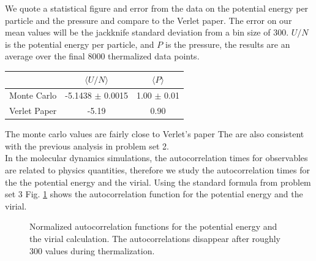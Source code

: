 \documentclass[singlepage,notitlepage,nofootinbib,11pt]{revtex4-1}
\begin{document}
We quote a statistical figure and error from the data on the potential energy per particle and the pressure and compare to the Verlet paper. The error on our mean values will be the jackknife standard deviation from a bin size of 300. $U/N$ is the potential energy per particle, and $P$ is the pressure, the results are an average over the final 8000 thermalized data points.
  \begin{center}
    \begin{tabular}{| c | c | c |}\hline
      \hspace{1pt} & $\langle U/N \rangle$ & $\langle P \rangle$ \\ \hline
      Monte Carlo  & -5.1438 $\pm$ 0.0015 &  1.00 $\pm$ 0.01 \\ \hline
      Verlet Paper & -5.19 & 0.90 \\ \hline
    \end{tabular}
  \end{center}
The monte carlo values are fairly close to Verlet's paper The are also consistent with the previous analysis in problem set 2.\\
\indent In the molecular dynamics simulations, the autocorrelation times for observables are related to physics quantities, therefore we study the autocorrelation times for the the potential energy and the virial. Using the standard formula from problem set 3 Fig. \ref{corrs} shows the autocorrelation function for the potential energy and the virial.
\begin{figure}[h]
  \centering
  \captionsetup[subfigure]{labelformat=empty}
  \caption{\label{corrs} Normalized autocorrelation functions for the potential energy and the virial calculation. The autocorrelations disappear after roughly 300 values during thermalization.}
\end{figure}
\end{document}
